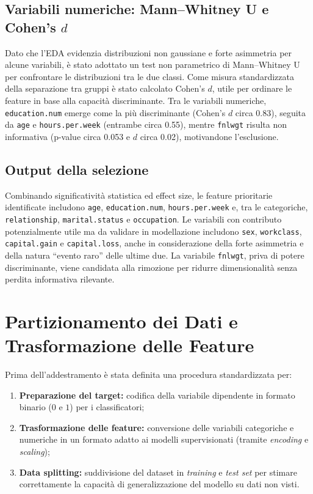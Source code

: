 \documentclass[a4paper,11pt]{article}
\begin{document}
\subsection{Variabili numeriche: Mann--Whitney U e Cohen’s \(d\)}
Dato che l’EDA evidenzia distribuzioni non gaussiane e forte asimmetria per alcune variabili, è stato adottato un test non parametrico di Mann--Whitney U per confrontare le distribuzioni tra le due classi. 
Come misura standardizzata della separazione tra gruppi è stato calcolato Cohen’s \(d\), utile per ordinare le feature in base alla capacità discriminante. 
Tra le variabili numeriche, \texttt{education.num} emerge come la più discriminante (Cohen’s \(d\) circa 0.83), seguita da \texttt{age} e \texttt{hours.per.week} (entrambe circa 0.55), mentre \texttt{fnlwgt} risulta non informativa (p-value circa 0.053 e \(d\) circa 0.02), motivandone l’esclusione. 

\subsection{Output della selezione}
Combinando significatività statistica ed effect size, le feature prioritarie identificate includono \texttt{age}, \texttt{education.num}, \texttt{hours.per.week} e, tra le categoriche, \texttt{relationship}, \texttt{marital.status} e \texttt{occupation}. 
Le variabili con contributo potenzialmente utile ma da validare in modellazione includono \texttt{sex}, \texttt{workclass}, \texttt{capital.gain} e \texttt{capital.loss}, anche in considerazione della forte asimmetria e della natura “evento raro” delle ultime due. 
La variabile \texttt{fnlwgt}, priva di potere discriminante, viene candidata alla rimozione per ridurre dimensionalità senza perdita informativa rilevante. 

\newpage
\section{Partizionamento dei Dati e Trasformazione delle Feature}

Prima dell'addestramento è stata definita una procedura standardizzata per:

\begin{enumerate}[label=(\roman*)]
    \item \textbf{Preparazione del target:} codifica della variabile dipendente in formato binario ($0$ e $1$) per i classificatori;
    \item \textbf{Trasformazione delle feature:} conversione delle variabili categoriche e numeriche in un formato adatto ai modelli supervisionati (tramite \textit{encoding} e \textit{scaling});
    \item \textbf{Data splitting:} suddivisione del dataset in \textit{training} e \textit{test set} per stimare correttamente la capacità di generalizzazione del modello su dati non visti.
\end{enumerate}
\end{document}
